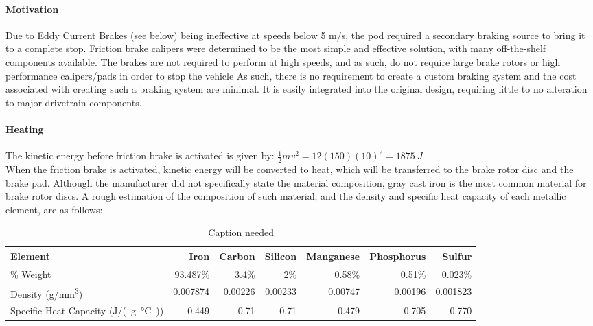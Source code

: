 \documentclass[main.tex]{subfile}
\begin{document}
    \paragraph{Motivation}
    Due to Eddy Current Brakes (see below) being ineffective at speeds below 5 m/s, the pod required a secondary braking source to bring it to a complete stop. Friction brake calipers were determined to be the most simple and effective solution, with many off-the-shelf components available. The brakes are not required to perform at high speeds, and as such, do not require large brake rotors or high performance calipers/pads in order to stop the vehicle  As such, there is no requirement to create a custom braking system and the cost associated with creating such a braking system are minimal. It is easily integrated into the original design, requiring little to no alteration to major drivetrain components.\\

    \paragraph{Heating}
    The kinetic energy before friction brake is activated is given by: $\frac{1}{2}mv^2=12(150)(10)^2=\SI{1875}{J}$\\
    When the friction brake is activated, kinetic energy will be converted to heat, which will be transferred to the brake rotor disc and the brake pad.
    Although the manufacturer did not specifically state the material composition, gray cast iron is the most common material for brake rotor discs. A rough estimation of the composition of such material, and the density and specific heat capacity of each metallic element, are as follows:\\

    \begin{table}[H]
        \centering
        \begin{tabular}{@{}lrrrrrr@{}} \toprule
            Element & Iron & Carbon & Silicon & Manganese & Phosphorus & Sulfur\\ \midrule
            \% Weight & 93.487\% & 3.4\% & 2\% & 0.58\% & 0.51\% & 0.023\%\\
            Density (\si{g/mm^3}) & 0.007874 & 0.00226 & 0.00233 & 0.00747 & 0.00196 & 0.001823\\
            Specific Heat Capacity (\si{J/(g\celsius)}) & 0.449 & 0.71 & 0.71 & 0.479 & 0.705 & 0.770\\ \bottomrule
        \end{tabular}
        \caption{Caption needed}
    \end{table}
\end{document}
